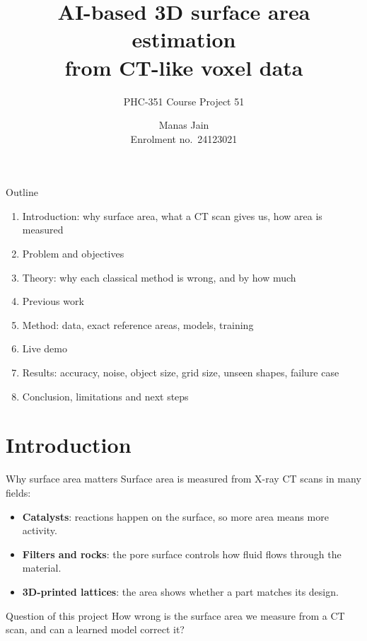 \documentclass[aspectratio=169,11pt]{beamer}
\title[AI-based 3D surface area estimation]{AI-based 3D surface area estimation\\ from CT-like voxel data}
\subtitle{PHC-351 Course Project 51}
\author[Manas Jain]{Manas Jain\\[2pt] {\small Enrolment no.\ 24123021}}
\date{}
\begin{document}
\begin{frame}
  \titlepage
\end{frame}

\begin{frame}{Outline}
  \begin{enumerate}
    \item Introduction: why surface area, what a CT scan gives us, how area is measured
    \item Problem and objectives
    \item Theory: why each classical method is wrong, and by how much
    \item Previous work
    \item Method: data, exact reference areas, models, training
    \item Live demo
    \item Results: accuracy, noise, object size, grid size, unseen shapes, failure case
    \item Conclusion, limitations and next steps
  \end{enumerate}
\end{frame}

\section{Introduction}
\begin{frame}{Why surface area matters}
  Surface area is measured from X-ray CT scans in many fields:
  \begin{itemize}
    \item \textbf{Catalysts}: reactions happen on the surface, so more area means more activity.
    \item \textbf{Filters and rocks}: the pore surface controls how fluid flows through the material.
    \item \textbf{3D-printed lattices}: the area shows whether a part matches its design.
  \end{itemize}
  \vspace{1em}
  \begin{block}{Question of this project}
    How wrong is the surface area we measure from a CT scan, and can a learned model correct it?
  \end{block}
\end{frame}
\end{document}
